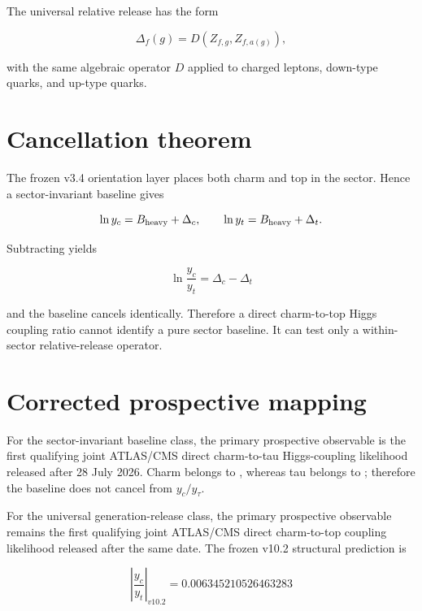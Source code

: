 The universal relative release has the form

\begin{equation}
\Delta_f(g)=D\!\left(Z_{f,g},Z_{f,a(g)}\right),
\label{eq:universal_relative_release}
\end{equation}

with the same algebraic operator $D$ applied to charged leptons, down-type
quarks, and up-type quarks.

\section{Cancellation theorem}

The frozen v3.4 orientation layer places both charm and top in the
 sector.  Hence a sector-invariant baseline
gives

\[
\ln y_c=B_{\rm heavy}+\Delta_c,
\qquad
\ln y_t=B_{\rm heavy}+\Delta_t.
\]

Subtracting yields

\begin{equation}
\boxed{
\ln\frac{y_c}{y_t}=\Delta_c-\Delta_t
}
\label{eq:yc_yt_baseline_cancellation}
\end{equation}

and the baseline cancels identically.  Therefore a direct charm-to-top Higgs
coupling ratio cannot identify a pure sector baseline.  It can test only a
within-sector relative-release operator.

\section{Corrected prospective mapping}

For the sector-invariant baseline class, the primary prospective observable is
the first qualifying joint ATLAS/CMS direct charm-to-tau Higgs-coupling
likelihood released after 28 July 2026.  Charm belongs to
, whereas tau belongs to
; therefore the baseline does not cancel
from $y_c/y_\tau$.

For the universal generation-release class, the primary prospective observable
remains the first qualifying joint ATLAS/CMS direct charm-to-top coupling
likelihood released after the same date.  The frozen v10.2 structural
prediction is

\begin{equation}
\boxed{
\left|\frac{y_c}{y_t}\right|_{v10.2}
=0.006345210526463283
}
\label{eq:frozen_yc_yt_prediction}
\end{equation}

